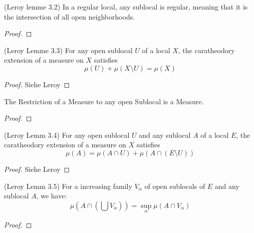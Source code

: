 \begin{lemma}
(Leroy lemme 3.2)
    \label{lem:regularity_of_sublocals}
    \leanok
    In a regular local, any sublocal is regular, meaning that it is the intersection of all open neighborhoods.
\end{lemma}
\begin{proof}
    \leanok
\end{proof}


\begin{lemma}
(Leroy Lemme 3.3)
    \label{lem:measure_add_compl_eq_top}
    \leanok
    For any open sublocal $U$ of a local $X$, the caratheodory extension of a measure on $X$ satisfies \[\mu(U) + \mu(X \setminus U) = \mu(X)\]
\end{lemma}
\begin{proof}
    \leanok
    Siehe Leroy
\end{proof}



\begin{lemma}[Restriction]
    The Restriction of a Measure to any open Sublocal is a Measure.
    \label{lem:restriction}
    \leanok
\end{lemma}
\begin{proof}
\leanok
\end{proof}

\begin{lemma}[Property 2]
(Leroy Lemm 3.4)
    \label{lem:restrict_add_compl_eq_top}
    \leanok
    For any open sublocal $U$ and any sublocal $A$ of a local $E$, the caratheodory extension of a measure on $X$ satisfies \[\mu(A) = \mu(A \cap U) + \mu(A \cap(E\setminus U))\]
\end{lemma}
\begin{proof}
    Siehe Leroy
    \leanok
\end{proof}

\begin{lemma}[Property 3]
(Leroy Lemm 3.5)
    \label{lem:restrict_preserves_sSup}
    \leanok
    For a increasing family $V_{\alpha}$ of open sublocals of $E$ and any sublocal $A$, we have:
    \[\mu(A \cap(\bigcup V_{\alpha})) = \sup_\alpha \mu(A\cap V_\alpha)\]
\end{lemma}
\begin{proof}
    \leanok
\end{proof}

